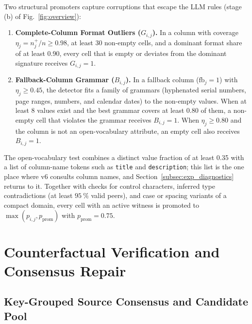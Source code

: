 \documentclass[conference]{IEEEtran}
\begin{document}
Two structural promoters capture corruptions that escape the LLM rules (stage (b) of Fig.~\ref{fig:overview}):
\begin{enumerate}[leftmargin=*, itemsep=0pt, topsep=1pt]
\item \textbf{Complete-Column Format Outliers ($G_{i,j}$).} In a column with coverage $\eta_j = n_j^{+} / n \ge 0.98$, at least 30 non-empty cells, and a dominant format share of at least 0.90, every cell that is empty or deviates from the dominant signature receives $G_{i,j} = 1$.
\item \textbf{Fallback-Column Grammar ($B_{i,j}$).} In a fallback column ($\mathrm{fb}_j = 1$) with $\eta_j \ge 0.45$, the detector fits a family of grammars (hyphenated serial numbers, page ranges, numbers, and calendar dates) to the non-empty values. When at least 8 values exist and the best grammar covers at least 0.80 of them, a non-empty cell that violates the grammar receives $B_{i,j} = 1$. When $\eta_j \ge 0.80$ and the column is not an open-vocabulary attribute, an empty cell also receives $B_{i,j} = 1$.
\end{enumerate}
The open-vocabulary test combines a distinct value fraction of at least 0.35 with a list of column-name tokens such as \texttt{title} and \texttt{description}; this list is the one place where v6 consults column names, and Section~\ref{subsec:exp_diagnostics} returns to it. Together with checks for control characters, inferred type contradictions (at least $95~\%$ valid peers), and case or spacing variants of a compact domain, every cell with an active witness is promoted to $\max(p_{i,j}, p_{\mathrm{prom}})$ with $p_{\mathrm{prom}} = 0.75$.

\section{Counterfactual Verification and Consensus Repair}
\label{sec:repair}

\subsection{Key-Grouped Source Consensus and Candidate Pool}
\label{subsec:rep_consensus}
\end{document}
